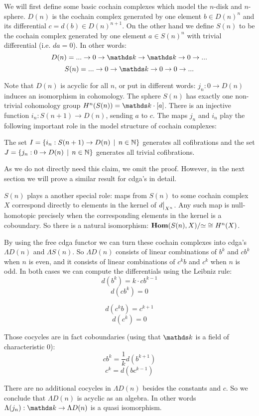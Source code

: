 
We will first define some basic cochain complexes which model the $n$-disk and $n$-sphere. $D(n)$ is the cochain complex generated by one element $b \in D(n)^n$ and its differential $c = d(b) \in D(n)^{n+1}$. On the other hand we define $S(n)$ to be the cochain complex generated by one element $a \in S(n)^n$ with trivial differential (i.e. $d a = 0$). In other words:
$$ D(n) = ... \to 0 \to \k \to \k \to 0 \to ... $$
$$ S(n) = ... \to 0 \to \k \to 0 \to 0 \to ... $$

Note that $D(n)$ is acyclic for all $n$, or put in different words: $j_n : 0 \to D(n)$ induces an isomorphism in cohomology. The sphere $S(n)$ has exactly one non-trivial cohomology group $H^n(S(n)) = \k \cdot [a]$. There is an injective function $i_n : S(n+1) \to D(n)$, sending $a$ to $c$. The maps $j_n$ and $i_n$ play the following important role in the model structure of cochain complexes:

\begin{claim}
	The set $I = \{i_n : S(n+1) \to D(n) \,\mid\, n \in \mathbb{N}\}$ generates all cofibrations and the set $J = \{j_n : 0 \to D(n) \,\mid\, n \in \mathbb{N}\}$ generates all trivial cofibrations.
\end{claim}

As we do not directly need this claim, we omit the proof. However, in the next section we will prove a similar result for cdga's in detail.

$S(n)$ plays a another special role: maps from $S(n)$ to some cochain complex $X$ correspond directly to elements in the kernel of $\restr{d}{X^n}$. Any such map is null-homotopic precisely when the corresponding elements in the kernel is a coboundary. So there is a natural isomorphism: $\mathbf{Hom}(S(n), X) / {\simeq} \cong H^n(X)$.

By using the free cdga functor we can turn these cochain complexes into cdga's $\Lambda D(n)$ and $\Lambda S(n) $. So $\Lambda D(n)$ consists of linear combinations of $b^k$ and $c b^k$ when $n$ is even, and it consists of linear combinations of $c^k b$ and $c^k$ when $n$ is odd. In both cases we can compute the differentials using the Leibniz rule:
$$ d(b^k) = k \cdot c b^{k-1} $$
$$ d(c b^k) = 0 $$

$$ d(c^k b) = c^{k+1} $$
$$ d(c^k) = 0 $$

Those cocycles are in fact coboundaries (using that $\k$ is a field of characteristic $0$):
$$ c b^k = \frac{1}{k} d(b^{k+1}) $$
$$ c^k = d(b c^{k-1}) $$

There are no additional cocycles in $\Lambda D(n)$ besides the constants and $c$. So we conclude that $\Lambda D(n)$ is acyclic as an  algebra. In other words $\Lambda(j_n): \k \to \Lambda D(n)$ is a quasi isomorphism.

